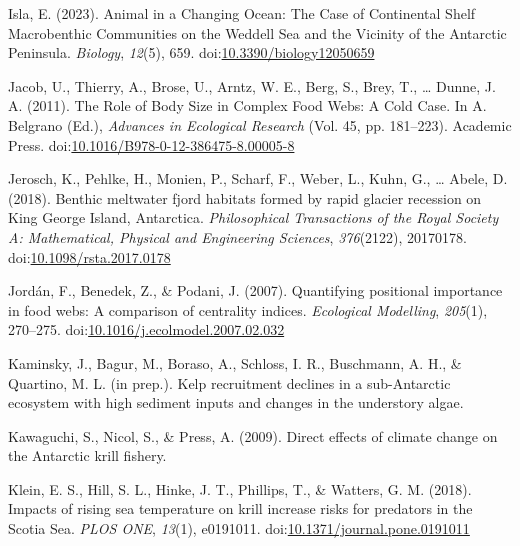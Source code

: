\documentclass[
]{article}
\newlength{\cslhangindent}
\newlength{\cslentryspacingunit} %
\newenvironment{CSLReferences}[2] %
 {%
  \setlength{\parindent}{0pt}
  \ifodd #1
  \let\oldpar\par
  \def\par{\hangindent=\cslhangindent\oldpar}
  \fi
  \setlength{\parskip}{#2\cslentryspacingunit}
 }%
 {}
\begin{document}
\begin{CSLReferences}{1}{0}
\leavevmode{}%
Isla, E. (2023). Animal in a
{Changing Ocean}: {The Case} of {Continental Shelf Macrobenthic
Communities} on the {Weddell Sea} and the {Vicinity} of the {Antarctic
Peninsula}. \emph{Biology}, \emph{12}(5), 659.
doi:\href{https://doi.org/10.3390/biology12050659}{10.3390/biology12050659}

\leavevmode{}%
Jacob, U., Thierry, A., Brose, U., Arntz, W. E., Berg, S., Brey, T.,
\ldots{} Dunne, J. A. (2011). The {Role} of {Body Size} in {Complex Food
Webs}: {A Cold Case}. In A. Belgrano (Ed.), \emph{Advances in
{Ecological Research}} (Vol. 45, pp. 181--223). {Academic Press}.
doi:\href{https://doi.org/10.1016/B978-0-12-386475-8.00005-8}{10.1016/B978-0-12-386475-8.00005-8}

\leavevmode{}%
Jerosch, K., Pehlke, H., Monien, P., Scharf, F., Weber, L., Kuhn, G.,
\ldots{} Abele, D. (2018). Benthic meltwater fjord habitats formed by
rapid glacier recession on {King George Island}, {Antarctica}.
\emph{Philosophical Transactions of the Royal Society A: Mathematical,
Physical and Engineering Sciences}, \emph{376}(2122), 20170178.
doi:\href{https://doi.org/10.1098/rsta.2017.0178}{10.1098/rsta.2017.0178}

\leavevmode{}%
Jordán, F., Benedek, Z., \& Podani, J. (2007). Quantifying positional
importance in food webs: {A} comparison of centrality indices.
\emph{Ecological Modelling}, \emph{205}(1), 270--275.
doi:\href{https://doi.org/10.1016/j.ecolmodel.2007.02.032}{10.1016/j.ecolmodel.2007.02.032}

\leavevmode{}%
Kaminsky, J., Bagur, M., Boraso, A., Schloss, I. R., Buschmann, A. H.,
\& Quartino, M. L. (in prep.). Kelp recruitment declines in a
sub-{Antarctic} ecosystem with high sediment inputs and changes in the
understory algae.

\leavevmode{}%
Kawaguchi, S., Nicol, S., \& Press, A. (2009). Direct effects of climate
change on the {Antarctic} krill fishery.

\leavevmode{}%
Klein, E. S., Hill, S. L., Hinke, J. T., Phillips, T., \& Watters, G. M.
(2018). Impacts of rising sea temperature on krill increase risks for
predators in the {Scotia Sea}. \emph{PLOS ONE}, \emph{13}(1), e0191011.
doi:\href{https://doi.org/10.1371/journal.pone.0191011}{10.1371/journal.pone.0191011}


\end{CSLReferences}
\end{document}
